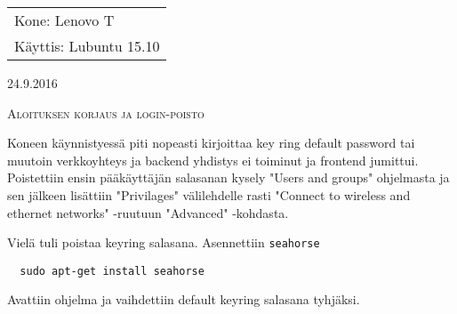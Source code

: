 \documentclass[main.tex]{subfiles}
\begin{document}
\thispagestyle{empty}
\begin{tabular}[t]{l}
Kone: Lenovo T\\
Käyttis: Lubuntu 15.10
\end{tabular}
\hfill 24.9.2016

{\scshape\Large{Aloituksen korjaus ja login-poisto}}

Koneen käynnistyessä piti nopeasti kirjoittaa key ring default password tai muutoin verkkoyhteys ja backend yhdistys ei toiminut ja frontend jumittui. Poistettiin ensin pääkäyttäjän salasanan kysely "Users and groups" ohjelmasta ja sen jälkeen lisättiin "Privilages" välilehdelle rasti "Connect to wireless and ethernet networks" -ruutuun "Advanced" -kohdasta.

Vielä tuli poistaa keyring salasana. Asennettiin \texttt{seahorse} 

\begin{lstlisting}
  sudo apt-get install seahorse
\end{lstlisting}

Avattiin ohjelma ja vaihdettiin default keyring salasana tyhjäksi.
\end{document}
